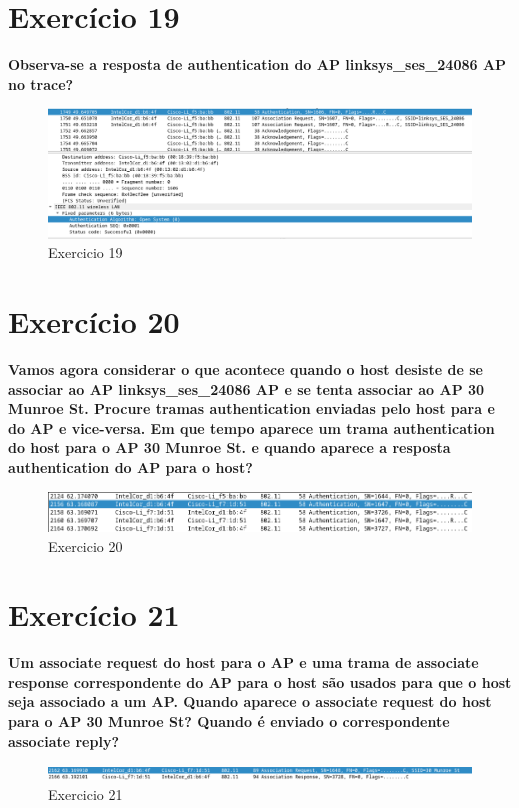 \documentclass[a4paper]{report}
\begin{document}
\section{Exercício 19}
\textbf{Observa-se a resposta de authentication do AP linksys\_ses\_24086 AP no
    trace?}
\begin{figure}[H]
    \centering 
    \includegraphics[width=\textwidth]{images/ex19.png}  
    \caption{Exercicio 19}
    \label{fig:ex19}
\end{figure}

\section{Exercício 20}
\textbf{Vamos agora considerar o que acontece quando o host desiste de se
    associar ao AP linksys\_ses\_24086 AP e se tenta associar ao AP 30 Munroe
    St. Procure tramas authentication enviadas pelo host para e do AP e
    vice-versa. Em que tempo aparece um trama authentication do host para o AP
    30 Munroe St. e quando aparece a resposta authentication do AP para o host?}
\begin{figure}[H]
    \centering 
    \includegraphics[width=\textwidth]{images/Ex20.png}  
    \caption{Exercicio 20}
    \label{fig:ex20}
\end{figure}

\section{Exercício 21}
\textbf{Um associate request do host para o AP e uma trama de associate response
    correspondente do AP para o host são usados para que o host seja associado a
    um AP. Quando aparece o associate request do host para o AP 30 Munroe St?
    Quando é enviado o correspondente associate reply?}
\begin{figure}[H]
    \centering 
    \includegraphics[width=\textwidth]{images/Ex21.png}  
    \caption{Exercicio 21}
    \label{fig:ex21}
\end{figure}
\end{document}
